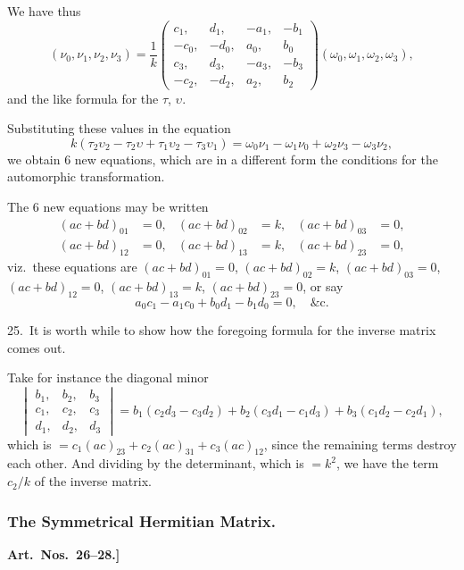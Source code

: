 \documentclass[11pt,a4paper]{book}
\begin{document}
We have thus
\[
(\nu_0, \nu_1, \nu_2, \nu_3) = \frac{1}{k}
\begin{pmatrix}
c_1, & d_1, & -a_1, & -b_1\\
-c_0, & -d_0, & a_0, & b_0\\
c_3, & d_3, & -a_3, & -b_3\\
-c_2, & -d_2, & a_2, & b_2
\end{pmatrix}
(\omega_0, \omega_1, \omega_2, \omega_3),
\]
and the like formula for the $\tau$, $\upsilon$.

Substituting these values in the equation
\[
k(\tau_2\upsilon_2 - \tau_2\upsilon + \tau_1\upsilon_2 - \tau_3\upsilon_1) = \omega_0\nu_1 - \omega_1\nu_0 + \omega_2\nu_3 - \omega_3\nu_2,
\]
we obtain 6 new equations, which are in a different form the conditions for the automorphic transformation.

The 6 new equations may be written
\begin{align*}
(ac + bd)_{01} &= 0, & (ac + bd)_{02} &= k, & (ac + bd)_{03} &= 0,\\
(ac + bd)_{12} &= 0, & (ac + bd)_{13} &= k, & (ac + bd)_{23} &= 0,
\end{align*}
viz.\ these equations are $(ac + bd)_{01} = 0$, $(ac + bd)_{02} = k$, $(ac + bd)_{03} = 0$, $(ac + bd)_{12} = 0$, $(ac + bd)_{13} = k$, $(ac + bd)_{23} = 0$, or say
\[
a_0c_1 - a_1c_0 + b_0d_1 - b_1d_0 = 0, \quad \text{\&c.}
\]

\medskip

25.\ It is worth while to show how the foregoing formula for the inverse matrix comes out.

Take for instance the diagonal minor
\[
\begin{vmatrix}
b_1, & b_2, & b_3\\
c_1, & c_2, & c_3\\
d_1, & d_2, & d_3
\end{vmatrix}
= b_1(c_2d_3 - c_3d_2) + b_2(c_3d_1 - c_1d_3) + b_3(c_1d_2 - c_2d_1),
\]
which is $= c_1(ac)_{23} + c_2(ac)_{31} + c_3(ac)_{12}$, since the remaining terms destroy each other. And dividing by the determinant, which is $= k^2$, we have the term $c_2/k$ of the inverse matrix.

\subsubsection*{The Symmetrical Hermitian Matrix.}

\textbf{Art.~Nos.~26--28.]
}
\end{document}
